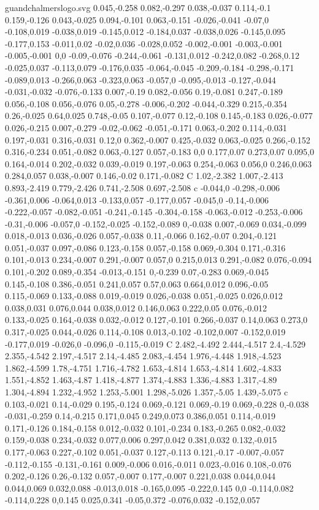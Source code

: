 \begin{filecontents}[noheader]{guandchalmerslogo.svg}
0.045,-0.258 0.082,-0.297 0.038,-0.037 0.114,-0.1 0.159,-0.126 0.043,-0.025 0.094,-0.101 0.063,-0.151 -0.026,-0.041 -0.07,0 -0.108,0.019 -0.038,0.019 -0.145,0.012 -0.184,0.037 -0.038,0.026 -0.145,0.095 -0.177,0.153 -0.011,0.02 -0.02,0.036 -0.028,0.052 -0.002,-0.001 -0.003,-0.001 -0.005,-0.001 0,0 -0.09,-0.076 -0.244,-0.061 -0.131,0.012 -0.242,0.082 -0.268,0.12 -0.025,0.037 -0.113,0.079 -0.176,0.035 -0.064,-0.045 -0.209,-0.184 -0.298,-0.171 -0.089,0.013 -0.266,0.063 -0.323,0.063 -0.057,0 -0.095,-0.013 -0.127,-0.044 -0.031,-0.032 -0.076,-0.133 0.007,-0.19 0.082,-0.056 0.19,-0.081 0.247,-0.189 0.056,-0.108 0.056,-0.076 0.05,-0.278 -0.006,-0.202 -0.044,-0.329 0.215,-0.354 0.26,-0.025 0.64,0.025 0.748,-0.05 0.107,-0.077 0.12,-0.108 0.145,-0.183 0.026,-0.077 0.026,-0.215 0.007,-0.279 -0.02,-0.062 -0.051,-0.171 0.063,-0.202 0.114,-0.031 0.197,-0.031 0.316,-0.031 0.12,0 0.362,-0.007 0.425,-0.032 0.063,-0.025 0.266,-0.152 0.316,-0.234 0.051,-0.082 0.063,-0.127 0.057,-0.183 0,0 0.177,0.07 0.273,0.07 0.095,0 0.164,-0.014 0.202,-0.032 0.039,-0.019 0.197,-0.063 0.254,-0.063 0.056,0 0.246,0.063 0.284,0.057 0.038,-0.007 0.146,-0.02 0.171,-0.082 C 1.02,-2.382 1.007,-2.413 0.893,-2.419 0.779,-2.426 0.741,-2.508 0.697,-2.508 c -0.044,0 -0.298,-0.006 -0.361,0.006 -0.064,0.013 -0.133,0.057 -0.177,0.057 -0.045,0 -0.14,-0.006 -0.222,-0.057 -0.082,-0.051 -0.241,-0.145 -0.304,-0.158 -0.063,-0.012 -0.253,-0.006 -0.31,-0.006 -0.057,0 -0.152,-0.025 -0.152,-0.089 0,-0.038 0.007,-0.069 0.034,-0.099 0.018,-0.013 0.036,-0.026 0.057,-0.038 0.11,-0.066 0.162,-0.07 0.204,-0.121 0.051,-0.037 0.097,-0.086 0.123,-0.158 0.057,-0.158 0.069,-0.304 0.171,-0.316 0.101,-0.013 0.234,-0.007 0.291,-0.007 0.057,0 0.215,0.013 0.291,-0.082 0.076,-0.094 0.101,-0.202 0.089,-0.354 -0.013,-0.151 0,-0.239 0.07,-0.283 0.069,-0.045 0.145,-0.108 0.386,-0.051 0.241,0.057 0.57,0.063 0.664,0.012 0.096,-0.05 0.115,-0.069 0.133,-0.088 0.019,-0.019 0.026,-0.038 0.051,-0.025 0.026,0.012 0.038,0.031 0.076,0.044 0.038,0.012 0.146,0.063 0.222,0.05 0.076,-0.012 0.133,-0.025 0.164,-0.038 0.032,-0.012 0.127,-0.101 0.266,-0.037 0.14,0.063 0.273,0 0.317,-0.025 0.044,-0.026 0.114,-0.108 0.013,-0.102 -0.102,0.007 -0.152,0.019 -0.177,0.019 -0.026,0 -0.096,0 -0.115,-0.019 C 2.482,-4.492 2.444,-4.517 2.4,-4.529 2.355,-4.542 2.197,-4.517 2.14,-4.485 2.083,-4.454 1.976,-4.448 1.918,-4.523 1.862,-4.599 1.78,-4.751 1.716,-4.782 1.653,-4.814 1.653,-4.814 1.602,-4.833 1.551,-4.852 1.463,-4.87 1.418,-4.877 1.374,-4.883 1.336,-4.883 1.317,-4.89 1.304,-4.894 1.232,-4.952 1.253,-5.001 1.298,-5.026 1.357,-5.05 1.439,-5.075 c 0.103,-0.021 0.14,-0.029 0.195,-0.124 0.069,-0.121 0.069,-0.19 0.069,-0.228 0,-0.038 -0.031,-0.259 0.14,-0.215 0.171,0.045 0.249,0.073 0.386,0.051 0.114,-0.019 0.171,-0.126 0.184,-0.158 0.012,-0.032 0.101,-0.234 0.183,-0.265 0.082,-0.032 0.159,-0.038 0.234,-0.032 0.077,0.006 0.297,0.042 0.381,0.032 0.132,-0.015 0.177,-0.063 0.227,-0.102 0.051,-0.037 0.127,-0.113 0.121,-0.17 -0.007,-0.057 -0.112,-0.155 -0.131,-0.161 0.009,-0.006 0.016,-0.011 0.023,-0.016 0.108,-0.076 0.202,-0.126 0.26,-0.132 0.057,-0.007 0.177,-0.007 0.221,0.038 0.044,0.044 0.044,0.069 0.032,0.088 -0.013,0.018 -0.165,0.095 -0.222,0.145 0,0 -0.114,0.082 -0.114,0.228 0,0.145 0.025,0.341 -0.05,0.372 -0.076,0.032 -0.152,0.057 
\end{filecontents}
